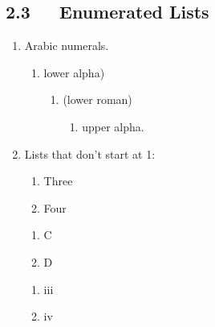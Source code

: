 \documentclass[a4paper]{article}
\newcounter{enumv}
\begin{document}
\subsection{2.3   Enumerated Lists}

\begin{enumerate}
\item Arabic numerals.

\begin{enumerate}
\renewcommand{\labelenumii}{\alph{enumii})}
\item lower alpha)

\begin{enumerate}
\renewcommand{\labelenumiii}{(\roman{enumiii})}
\item (lower roman)

\begin{enumerate}
\item upper alpha.

\end{enumerate}
\end{enumerate}
\end{enumerate}

\item Lists that don’t start at 1:

\begin{enumerate}
\renewcommand{\labelenumii}{\arabic{enumii}.}
\setcounter{enumii}{2}
\item Three

\item Four
\end{enumerate}

\begin{enumerate}
\renewcommand{\labelenumii}{\Alph{enumii}.}
\setcounter{enumii}{2}
\item C

\item D
\end{enumerate}

\begin{enumerate}
\renewcommand{\labelenumii}{\roman{enumii}.}
\setcounter{enumii}{2}
\item iii

\item iv
\end{enumerate}
\end{enumerate}
\end{document}
